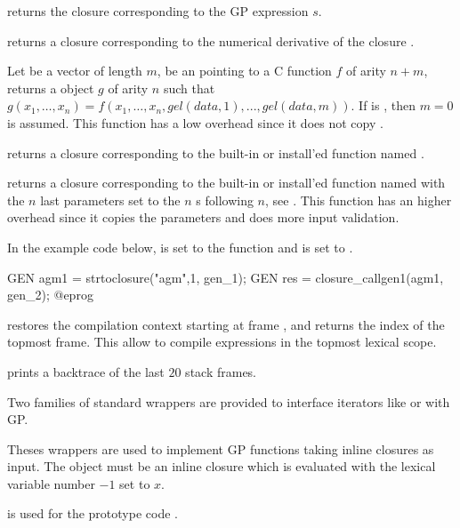  returns the closure corresponding to the
GP expression $s$.

 returns a closure corresponding to the
numerical derivative of the closure .

Let  be a vector of length $m$,  be an 
pointing to a C function $f$ of arity $n+m$, returns a  object
$g$ of arity $n$ such that
$g(x_1,\ldots,x_n)=f(x_1,\ldots,x_n,gel(data,1),...,gel(data,m))$. If
 is , then $m=0$ is assumed.  This function has a low
overhead since it does not copy .

 returns a closure corresponding to the
built-in or install'ed function named .

 returns a closure
corresponding to the built-in or install'ed function named  with the
$n$ last parameters set to the $n$ s following $n$, see
. This function has an higher overhead since it copies the
parameters and does more input validation.

In the example code below,  is set to the function
 and  is set to .

\bprog
  GEN agm1 = strtoclosure("agm",1, gen_1);
  GEN res = closure_callgen1(agm1, gen_2);
@eprog

 restores the compilation context starting
at frame , and returns the index of the topmost frame. This allow to
compile expressions in the topmost lexical scope.

 prints a backtrace of the last $20$ stack frames.

Two families of standard wrappers are provided to interface iterators like
 or  with GP.

Theses wrappers are used to implement GP functions taking inline closures as
input. The object  must be an inline closure which is evaluated
with the lexical variable number $-1$ set to $x$.

 is used for the prototype code .

